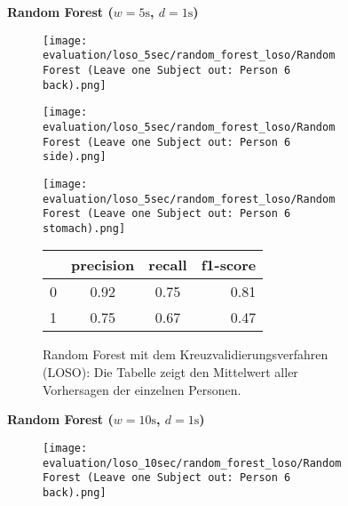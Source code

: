 \begin{figure}[ht]
  \textbf{Random Forest ($w=5\si{\s}$, $d=1\si{\s}$)}
    \centering
    \begin{subfigure}{1\textwidth}
        \texttt{[image: evaluation/loso\_5sec/random\_forest\_loso/Random Forest (Leave one Subject out: Person 6 back).png]}
      \end{subfigure}
      \begin{subfigure}{1\textwidth}
        \texttt{[image: evaluation/loso\_5sec/random\_forest\_loso/Random Forest (Leave one Subject out: Person 6 side).png]}
      \end{subfigure}
      \begin{subfigure}{1\textwidth}
        \texttt{[image: evaluation/loso\_5sec/random\_forest\_loso/Random Forest (Leave one Subject out: Person 6 stomach).png]}
    \end{subfigure}
    \begin{subfigure}{1\textwidth}
        \begin{center}
            \begin{tabular}{ | l | c | c | r | }
              \hline
               & precision & recall & f1-score\\ \hline
              0 & 0.92 & 0.75 & 0.81 \\ \hline
              1 & 0.75 & 0.67 & 0.47 \\
              \hline
            \end{tabular}
        \end{center}
        \caption{Random Forest mit dem Kreuzvalidierungsverfahren (LOSO): Die Tabelle zeigt den Mittelwert aller Vorhersagen der einzelnen Personen.}
        \label{implementation:app:screenshots:user_studies_information}
    \end{subfigure}
    \newline
    \vspace*{1 cm}
    \newline
    \textbf{Random Forest ($w=10\si{\s}$, $d=1\si{\s}$)}
    \begin{subfigure}{1\textwidth}
      \texttt{[image: evaluation/loso\_10sec/random\_forest\_loso/Random Forest (Leave one Subject out: Person 6 back).png]}

\end{subfigure}
\end{figure}
